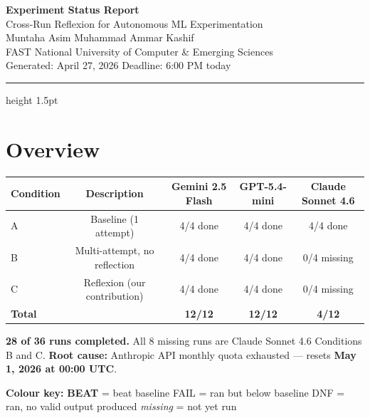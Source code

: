\documentclass[11pt,a4paper]{article}
\begin{document}
\begin{center}
  {\LARGE\bfseries\color{headerblue} Experiment Status Report}\\[0.4em]
  {\large Cross-Run Reflexion for Autonomous ML Experimentation}\\[0.3em]
  {\normalsize Muntaha Asim \quad\textbullet\quad Muhammad Ammar Kashif}\\
  {\normalsize FAST National University of Computer \& Emerging Sciences}\\[0.3em]
  {\small Generated: April 27, 2026 \quad\textbullet\quad Deadline: 6:00 PM today}
\end{center}

\vspace{0.5em}
\hrule height 1.5pt
\vspace{1em}

\section*{Overview}

\begin{center}
\begin{tabular}{lcccc}
\toprule
\textbf{Condition} & \textbf{Description} & \textbf{Gemini 2.5 Flash} & \textbf{GPT-5.4-mini} & \textbf{Claude Sonnet 4.6} \\
\midrule
A & Baseline (1 attempt)          & 4/4 done & 4/4 done & 4/4 done \\
B & Multi-attempt, no reflection  & 4/4 done & 4/4 done & \cellcolor{missingyellow}0/4 missing \\
C & Reflexion (our contribution)  & 4/4 done & 4/4 done & \cellcolor{missingyellow}0/4 missing \\
\midrule
\textbf{Total} & & \textbf{12/12} & \textbf{12/12} & \textbf{4/12} \\
\bottomrule
\end{tabular}
\end{center}

\vspace{0.3em}
\textbf{28 of 36 runs completed.} All 8 missing runs are Claude Sonnet 4.6 Conditions B and C.
\textbf{Root cause:} Anthropic API monthly quota exhausted --- resets \textbf{May 1, 2026 at 00:00 UTC}.

\vspace{0.5em}
\textbf{Colour key:}
\quad \colorbox{beatgreen}{\textbf{BEAT}} = beat baseline
\quad \colorbox{failred}{FAIL} = ran but below baseline
\quad \colorbox{dnforange}{DNF} = ran, no valid output produced
\quad \colorbox{missingyellow}{\textit{missing}} = not yet run
\end{document}
